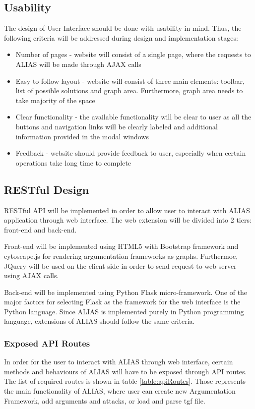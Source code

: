 \subsection{Usability}
The design of User Interface should be done with usability in mind. Thus, the following criteria will be addressed during design and implementation stages:
\begin{itemize}
	\item Number of pages - website will consist of a single page, where the requests to ALIAS will be made through AJAX calls
	\item Easy to follow layout - website will consist of three main elements: toolbar, list of possible solutions and graph area. Furthermore, graph area needs to take majority of the space
	\item Clear functionality - the available functionality will be clear to user as all the buttons and navigation links will be clearly labeled and additional information provided in the modal windows
	\item Feedback - website should provide feedback to user, especially when certain operations take long time to complete
\end{itemize}

\subsection{RESTful Design}
RESTful API will be implemented in order to allow user to interact with ALIAS application through web interface. The web extension will be divided into 2 tiers: front-end and back-end. 

Front-end will be implemented using HTML5 with Bootstrap framework and cytoscape.js \citep{cytoscapejs} for rendering argumentation frameworks as graphs. Furthermoe, JQuery will be used on the client side in order to send request to web server using AJAX calls.

Back-end will be implemented using Python Flask \citep{flaskDocs} micro-framework. One of the major factors for selecting Flask as the framework for the web interface is the Python language. Since ALIAS is implemented purely in Python programming language, extensions of ALIAS should follow the same criteria. 

\subsubsection{Exposed API Routes} 
In order for the user to interact with ALIAS through web interface, certain methods and behaviours of ALIAS will have to be exposed through API routes. The list of required routes is shown in table \ref{table:apiRoutes}. Those represents the main functionality of ALIAS, where user can create new Argumentation Framework, add arguments and attacks, or load and parse tgf file.


